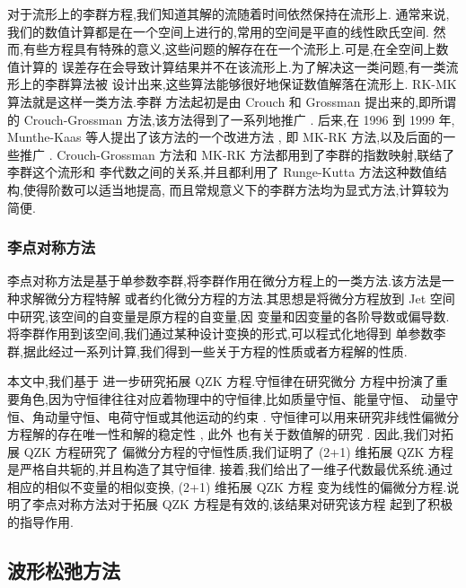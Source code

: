 对于流形上的李群方程,我们知道其解的流随着时间依然保持在流形上.
通常来说,我们的数值计算都是在一个空间上进行的,常用的空间是平直的线性欧氏空间.
然而,有些方程具有特殊的意义,这些问题的解存在在一个流形上.可是,在全空间上数值计算的
误差存在会导致计算结果并不在该流形上.为了解决这一类问题,有一类流形上的李群算法被
设计出来,这些算法能够很好地保证数值解落在流形上. RK-MK 算法就是这样一类方法.李群
方法起初是由 Crouch 和 Grossman \cite{crouch1993numerical} 提出来的,即所谓
的 Crouch-Grossman 方法,该方法得到了一系列地推广
\cite{faleinsen2001multi,zaletkin2010numerical,bulychev2001numerical,buono2003numerical,billo1992numerical}.
后来,在 1996 到 1999 年, Munthe-Kaas  等人提出了该方法的一个改进方法
\cite{mk1996lie,mk1997numerical,mk1998runge,mk1999high}, 即 MK-RK 方法,以及后面的一些推广 \cite{ostermann2010exponential,owren2000the,bruls2012lie,munthe2013onpost,garcla2011onalg}.
Crouch-Grossman 方法和 MK-RK 方法都用到了李群的指数映射,联结了李群这个流形和
李代数之间的关系,并且都利用了 Runge-Kutta 方法这种数值结构,使得阶数可以适当地提高,
而且常规意义下的李群方法均为显式方法,计算较为简便.

\subsubsection*{\textbf{李点对称方法}}

李点对称方法是基于单参数李群,将李群作用在微分方程上的一类方法.该方法是一种求解微分方程特解
或者约化微分方程的方法.其思想是将微分方程放到 Jet 空间中研究,该空间的自变量是原方程的自变量,因
变量和因变量的各阶导数或偏导数.将李群作用到该空间,我们通过某种设计变换的形式,可以程式化地得到
单参数李群,据此经过一系列计算,我们得到一些关于方程的性质或者方程解的性质.

本文中,我们基于 \cite{sjoberg2007dou} 进一步研究拓展 QZK 方程.守恒律在研究微分
方程中扮演了重要角色,因为守恒律往往对应着物理中的守恒律,比如质量守恒、能量守恒、
动量守恒、角动量守恒、电荷守恒或其他运动的约束 \cite{mushtaq2005non,song2013top,song2013dom}.
守恒律可以用来研究非线性偏微分方程解的存在唯一性和解的稳定性 \cite{wang2014soli}, 此外
也有关于数值解的研究 \cite{wazwaz2005exact,wazwaz2008the}. 因此,我们对拓展 QZK 方程研究了
偏微分方程的守恒性质,我们证明了 (2+1) 维拓展 QZK 方程是严格自共轭的,并且构造了其守恒律.
接着,我们给出了一维子代数最优系统.通过相应的相似不变量的相似变换, (2+1) 维拓展 QZK 方程
变为线性的偏微分方程.说明了李点对称方法对于拓展 QZK 方程是有效的,该结果对研究该方程
起到了积极的指导作用.

\subsection{波形松弛方法}


